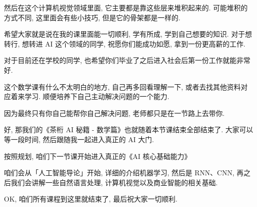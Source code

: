 然后在这个计算机视觉领域里面, 它主要都是靠这些层来堆积起来的. 可能堆积的方式不同, 这里面会有些小技巧, 但是它的骨架都是一样的. 

希望大家就是说在我的课里面能一切顺利, 学有所成, 学到自己想要的知识. 对于想转行, 想转进 AI 这个领域的同学, 祝愿你们能成功如愿, 拿到一份更高薪的工作. 

对于目前还在学校的同学, 也希望你们毕业了之后进入社会后第一份工作就能非常好. 

这个数学课有什么不太明白的地方, 自己再多回看理解一下, 或者去找其他资料对应着来学习. 顺便培养下自己主动解决问题的一个能力. 

因为最终只有你自己能帮你自己解决问题, 老师都只是在一节路上去带你. 

好, 那我们的《茶桁 AI 秘籍 - 数学篇》也就随着本节课结束全部结束了. 大家可以等一段时间, 然后跟随我一起进入真正的 AI 大门. 

按照规划, 咱们下一节课开始进入真正的《AI 核心基础能力》

咱们会从「人工智能导论」开始, 详细的介绍机器学习, 然后是 RNN、CNN, 再之后我们会讲解一些自然语言处理, 计算机视觉以及商业智能的相关基础. 

OK, 咱们所有课程到这里就结束了, 最后祝大家一切顺利. 

